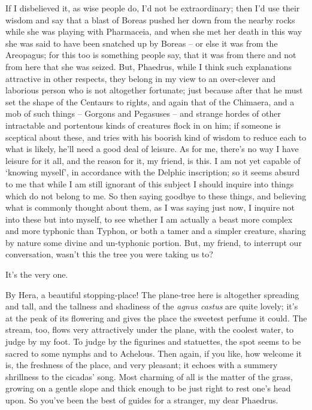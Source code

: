 If I disbelieved it, as wise
people do, I'd not be
extraordinary; then I'd use their wisdom and say that a blast of Boreas
pushed her down from the nearby rocks while she was playing with
Pharmaceia, and when she met her death in this  way she was said
to have been snatched up by Boreas -- or else it was from the Areopagus;
for this too is something people say, that it was from there and not
from here that she was seized. But, Phaedrus, while I think such
explanations attractive in other respects, they belong in my view to an
over-clever and  laborious person who is not altogether
fortunate; just because after that he must set the shape of the Centaurs
to rights, and again that of the Chimaera, and a mob of such things --
Gorgons  and Pegasuses -- and strange hordes of other
intractable and portentous kinds of creatures flock in on him; if
someone is sceptical about these, and tries with his boorish kind of
wisdom to reduce each to what is likely, he'll need a good deal of
leisure.  As for me, there's no way I have leisure for it all,
and the reason for it, my friend, is this. I am not yet capable of
‘knowing myself', in accordance with the Delphic
inscription; so it seems
 absurd to me that while I am still ignorant of this subject I
should inquire into things which do not belong to me. So then saying
goodbye to these things, and believing what is commonly thought about
them, as I was saying just now, I inquire not into these but into
myself, to see whether I am actually a beast  more complex and
more typhonic than
Typhon, or both a tamer
and a simpler creature, sharing by nature some divine and un-typhonic
portion. But, my friend, to interrupt our
conversation, wasn't this
the tree you were taking us to?

 It's the very one.

By Hera, a beautiful
stopping-place! The
plane-tree here is altogether spreading and tall, and the tallness and
shadiness of the {\em agnus
castus} are quite lovely;
it's at the peak  of its flowering and gives the place the
sweetest perfume it could. The stream, too, flows very attractively
under the plane, with the coolest water, to judge by my foot. To judge
by the figurines and statuettes, the spot seems to be sacred to some
 nymphs and to
Achelous. Then again, if
you like, how welcome it is, the freshness of the place, and very
pleasant; it echoes with a summery shrillness to the cicadas' song. Most
charming of all is the matter of the grass, growing on a gentle slope
and thick enough to be just right to rest one's head upon. So you've
 been the best of guides for a stranger, my dear Phaedrus.

